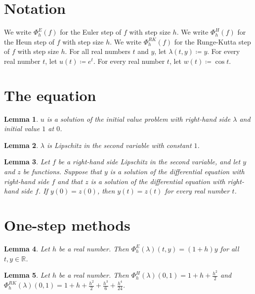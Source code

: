 \documentclass{article}
\newtheorem{lemma}{Lemma}
\begin{document}
\section{Notation}

We write $\Phi^E_h(f)$ for the Euler step of $f$ with step size $h$.
We write $\Phi^H_h(f)$ for the Heun step of $f$ with step size $h$.
We write $\Phi^{RK}_h(f)$ for the Runge-Kutta step of $f$ with step size $h$.
For all real numbers $t$ and $y$, let $\lambda(t,y)\coloneqq y$.
For every real number $t$, let $u(t)\coloneqq e^t$.
For every real number $t$, let $w(t)\coloneqq\cos t$.

\section{The equation}

\begin{lemma}\label{exp}
$u$ is a solution of the initial value problem with right-hand side $\lambda$ and initial value $1$ at $0$.
\end{lemma}

\begin{lemma}\label{lipschitz}
$\lambda$ is Lipschitz in the second variable with constant $1$.
\end{lemma}

\begin{lemma}\label{unique}
Let $f$ be a right-hand side Lipschitz in the second variable, and let $y$ and $z$ be functions. Suppose that $y$ is a solution of the differential equation with right-hand side $f$ and that $z$ is a solution of the differential equation with right-hand side $f$. If $y(0)=z(0)$, then $y(t)=z(t)$ for every real number $t$.
\end{lemma}

\section{One-step methods}

\begin{lemma}\label{euler}
Let $h$ be a real number. Then $\Phi^E_h(\lambda)(t,y)=(1+h)y$ for all $t,y\in\mathbb{R}$.
\end{lemma}

\begin{lemma}\label{heun}
Let $h$ be a real number. Then $\Phi^H_h(\lambda)(0,1)=1+h+\frac{h^2}{2}$ and $\Phi^{RK}_h(\lambda)(0,1)=1+h+\frac{h^2}{2}+\frac{h^3}{6}+\frac{h^4}{24}$.
\end{lemma}
\end{document}
